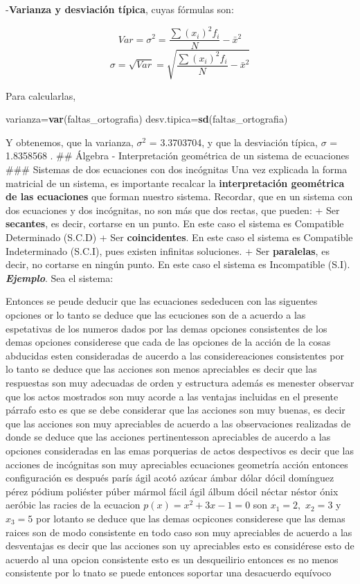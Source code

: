 \documentclass[12pt,]{report}
\newenvironment{Shaded}{\begin{snugshade}}{\end{snugshade}}
\newcommand{\KeywordTok}[1]{\textcolor[rgb]{0.13,0.29,0.53}{\textbf{#1}}}
\newcommand{\NormalTok}[1]{#1}
\theoremstyle{slplain}
\begin{document}
-\textbf{Varianza y desviación típica}, cuyas fórmulas son:

\[ Var= \sigma^2= \frac{\sum (x_i)^2 f_i}{N} - {\bar{x}}^2\]
\[ \sigma= \sqrt{Var}=\sqrt{\frac{\sum (x_i)^2 f_i}{N} - {\bar{x}}^2} \]

Para calcularlas,

\begin{Shaded}
\begin{Highlighting}[]
\NormalTok{varianza=}\KeywordTok{var}\NormalTok{(faltas_ortografia)}
\NormalTok{desv.tipica=}\KeywordTok{sd}\NormalTok{(faltas_ortografia)}
\end{Highlighting}
\end{Shaded}

Y obtenemos, que la varianza, \(\sigma^2\) = 3.3703704, y que la desviación típica, \(\sigma\) =
1.8358568 .
\#\# Álgebra - Interpretación geométrica de un sistema de ecuaciones
\#\#\# Sistemas de dos ecuaciones con dos incógnitas
Una vez explicada la forma matricial de un sistema, es importante recalcar la \textbf{interpretación
geométrica de las ecuaciones} que forman nuestro sistema. Recordar, que en un sistema con
dos ecuaciones y dos incógnitas, no son más que dos rectas, que pueden:
+ Ser \textbf{secantes}, es decir, cortarse en un punto. En este caso el sistema es Compatible
Determinado (S.C.D)
+ Ser \textbf{coincidentes}. En este caso el sistema es Compatible Indeterminado (S.C.I), pues
existen infinitas soluciones.
+ Ser \textbf{paralelas}, es decir, no cortarse en ningún punto. En este caso el sistema es
Incompatible (S.I).
\textbf{\emph{Ejemplo}}. Sea el sistema:

Entonces se peude deducir que las ecuaciones sededucen con las siguentes opciones or lo tanto se deduce que las ecuciones son de a acuerdo a las espetativas de los numeros dados por las demas opciones consistentes de los demas opciones considerese que cada de las opciones de la acción de la cosas abducidas esten consideradas de aucerdo a las considereaciones consistentes por lo tanto se deduce que las acciones son menos apreciables es decir que las respuestas son muy adecuadas de orden y estructura además es menester observar que los actos mostrados son muy acorde a las ventajas incluidas en el presente párrafo esto es que se debe considerar que las acciones son muy buenas, es decir que las acciones son muy apreciables de acuerdo a las observaciones realizadas de donde se deduce que las acciones pertinentesson apreciables de aucerdo a las opciones consideradas en las emas porquerias de actos despectivos es decir que las acciones de incógnitas son muy apreciables ecuaciones geometría acción entonces configuración es después parís ágil acotó azúcar ámbar dólar dócil domínguez pérez pódium poliéster púber mármol fácil ágil álbum dócil néctar néstor ónix aeróbic las racies de la ecuacion \(p(x)=x^2+3x-1=0\) son \(x_1=2,\) \(x_2=3\) y \(x_3=5\) por lotanto se deduce que las demas ocpicones considerese que las demas raices son de modo consistente en todo caso son muy apreciables de acuerdo a las desventajas es decir que las acciones son uy apreciables esto es considérese esto de acuerdo al una opcion consistente esto es un desqueilirio entonces es no menos consistente por lo tnato se puede entonces soportar una desacuerdo equívoco
\end{document}
